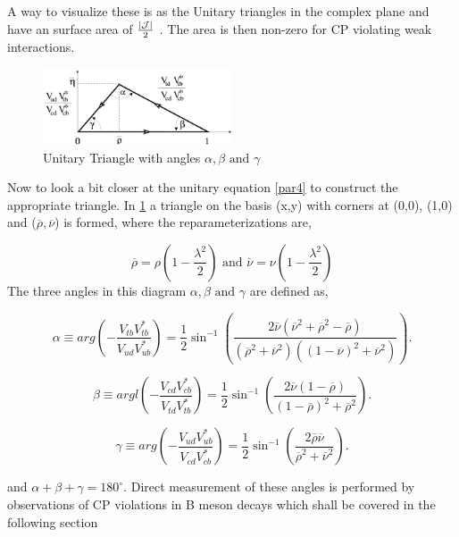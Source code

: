 A way to visualize these is as the Unitary triangles in the complex plane and have an surface area of $\frac{\left|\cal{J}\right|}{2}$ \cite{CKM11}. The area is then non-zero for CP violating weak interactions.

\begin{figure}[h]
\centering
\includegraphics[width=0.5\textwidth]{figs/ckmfig5.jpg}
\caption{Unitary Triangle with angles $\alpha, \beta \mbox{ and } \gamma$}
\label{tri4}
\end{figure}
Now to look a bit closer at the unitary equation  \ref{par4} to construct the appropriate triangle. In \cref{tri4} a triangle on the basis (x,y) with corners at (0,0), (1,0) and ($\overline{\rho},\overline{\nu}$) is formed, where the reparameterizations are,

\begin{equation}\label{pv1}
\overline{\rho}=\rho\left(1-\frac{\lambda^2}{2}\right) \mbox{ and } \overline{\nu}=\nu\left(1-\frac{\lambda^2}{2}\right)
\end{equation}
The three angles in this diagram $\alpha , \beta \mbox{ and } \gamma$ are defined as,

\begin{equation}\label{ang1}
 \alpha\equiv arg\left(-\frac{V_{tb}V^{*}_{tb}}{V_{ud}V^{*}_{ub}}\right) =\frac{1}{2}\sin^{-1}\left(\frac{2\overline{\nu}(\overline{\nu}^2+\overline{\rho}^2-\overline{\rho})}{(\overline{\rho}^2+\overline{\nu}^2)((1-\overline{\nu})^2+\overline{\nu}^2)}\right) .
\end{equation}

\begin{equation}\label{ang2}
\beta\equiv argl\left(-\frac{V_{cd}V^{*}_{cb}}{V_{td}V^{*}_{tb}}\right) = \frac{1}{2}\sin^{-1}\left(\frac{2\overline{\nu}(1-\overline{\rho})}{(1-\overline{\rho})^2+\overline{\rho}^2}\right).
\end{equation}

\begin{equation}\label{ang3}
\gamma\equiv arg\left(-\frac{V_{ud}V^{*}_{ub}}{V_{cd}V^{*}_{cb}}\right) = \frac{1}{2}\sin^{-1}\left(\frac{2\overline{\rho}\overline{\nu}}{\overline{\rho}^2+\overline{\nu}^2}\right).
\end{equation}

and $\alpha + \beta + \gamma = 180^{\circ}$. Direct measurement of these angles is performed by observations of CP violations in B meson decays which shall be covered in the following section \cite{CKM7}



